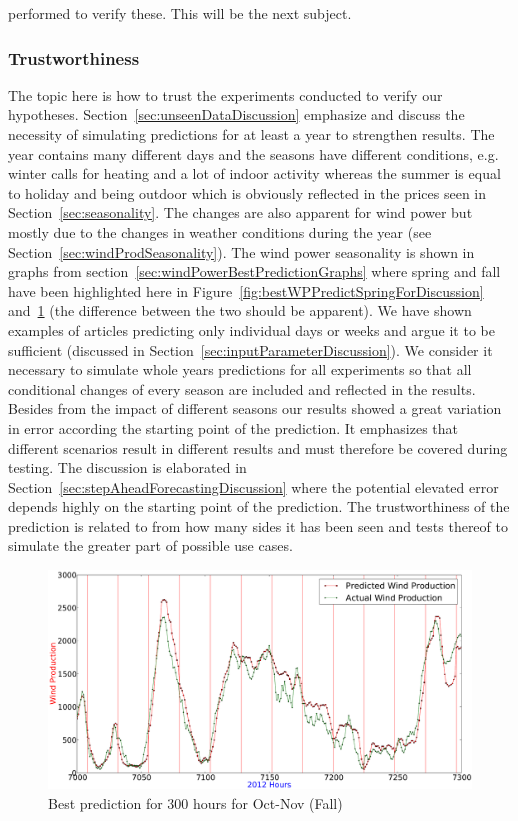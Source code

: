 performed to verify these. This will be the next subject. 

\subsubsection{Trustworthiness}
The topic here is how to trust the experiments conducted to verify our hypotheses. Section~\ref{sec:unseenDataDiscussion} emphasize and discuss the necessity of simulating predictions for at least a year to strengthen results. The year contains many different days and the seasons have different conditions, e.g. winter calls for heating and a lot of indoor activity whereas the summer is equal to holiday and being outdoor which is obviously reflected in the prices seen in Section~\ref{sec:seasonality}. The changes are also apparent for wind power but mostly due to the changes in weather conditions during the year (see Section~\ref{sec:windProdSeasonality}). The wind power seasonality is shown in graphs from section~\ref{sec:windPowerBestPredictionGraphs} where spring and fall have been highlighted here in Figure~\ref{fig:bestWPPredictSpringForDiscussion} and~\ref{fig:bestPredictWPFallForDiscussion} (the difference between the two should be apparent). We have shown examples of articles predicting only individual days or weeks and argue it to be sufficient (discussed in Section~\ref{sec:inputParameterDiscussion}). We consider it necessary to simulate whole years predictions for all experiments so that all conditional changes of every season are included and reflected in the results. Besides from the impact of different seasons our results showed a great variation in error according the starting point of the prediction. It emphasizes that different scenarios result in different results and must therefore be covered during testing. The discussion is elaborated in Section~\ref{sec:stepAheadForecastingDiscussion} where the potential elevated error depends highly on the starting point of the prediction. The trustworthiness of the prediction is related to from how many sides it has been seen and tests thereof to simulate the greater part of possible use cases. 

\begin{figure}[H]
\centering
\includegraphics[width=0.99\linewidth]{billeder/bestPossiblePredictionWindProduction7000-7300_Fall.png}
\caption{Best prediction for 300 hours for Oct-Nov (Fall)}
\label{fig:bestPredictWPFallForDiscussion}
\end{figure}

